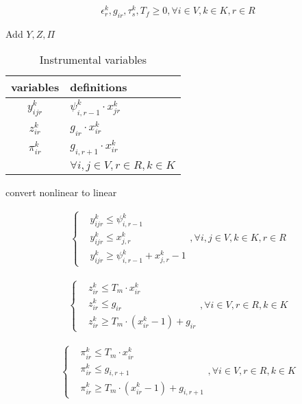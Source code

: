 \documentclass[preprint,12pt,authoryear]{elsarticle}
\begin{document}
\begin{equation}
    \epsilon_r^k,g_{ir},\tau_s^k,T_f\geq 0,\forall i\in V, k\in K,r\in R
\label{ddc}
\end{equation}

Add $Y,Z,\Pi$
\begin{longtable}{cl}%
    \caption{Instrumental variables}\label{tab2}\\
    \toprule [2pt] %
    variables& definitions \\
    \midrule [1pt]  
    $y_{ijr}^k$& $\psi_{i,r-1}^k\cdot x_{jr}^k$ \\
    $z_{ir}^k$& $g_{ir}\cdot x_{ir}^k$ \\
    $\pi_{ir}^k$& $g_{i,r+1}\cdot x_{ir}^k$ \\
    &$\forall i,j\in V, r\in R, k\in K$ \\
    \bottomrule [2pt]
\end{longtable}

convert nonlinear to linear

\begin{equation}
    \begin{split}
        \begin{cases}
            & y_{ijr}^k\leq \psi_{i,r-1}^k \\
            & y_{ijr}^k\leq x_{j,r}^k \\
            & y_{ijr}^k\geq \psi_{i,r-1}^k+x_{j,r}^k-1
        \end{cases}, \forall i,j\in V,k\in K,r\in R
    \end{split}
    \label{nly}
\end{equation}

\begin{equation}
    \begin{split}
        \begin{cases}
            & z_{ir}^k\leq T_m\cdot x_{ir}^k \\
            & z_{ir}^k\leq g_{ir}\\
            & z_{ir}^k\geq T_m\cdot(x_{ir}^k -1) + g_{ir}
        \end{cases}, \forall i\in V, r\in R, k\in K
    \end{split}
    \label{nlz}
\end{equation}

\begin{equation}
    \begin{split}
        \begin{cases}
            & \pi_{ir}^k\leq T_m\cdot x_{ir}^k \\
            & \pi_{ir}^k\leq g_{i,r+1} \\
            & \pi_{ir}^k\geq T_m\cdot(x_{ir}^k -1) + g_{i,r+1}
        \end{cases},  \forall i\in V, r\in R, k\in K
    \end{split}
    \label{nlpi}
\end{equation}
\end{document}
